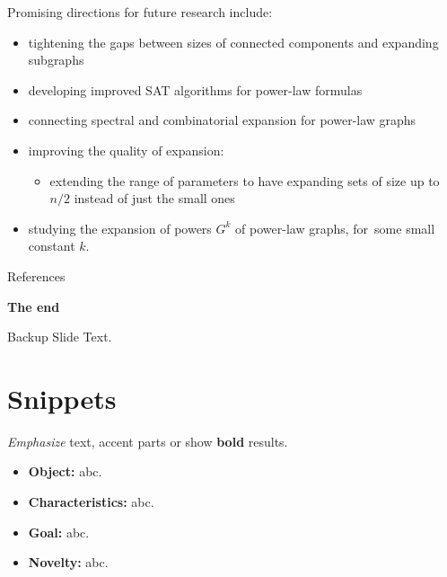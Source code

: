\documentclass{beamer}
\newcommand{\autotitle}{\secname\ifdefempty{\subsecname}{}{~--- \subsecname}}
\newcommand{\clearsubsecname}{\long\def\subsecname{}}
\begin{document}
\begin{frame}{\autotitle}
    \small
    Promising directions for future research include:
    \begin{itemize}
        \item tightening the gaps between sizes of connected components and expanding subgraphs
        \item developing improved SAT algorithms for power-law formulas
        \item connecting spectral and combinatorial expansion for power-law graphs
        \item improving the quality of expansion:
        \begin{itemize}
            \item extending the range of parameters to have expanding sets
            of size up to $n/2$ instead of just the small ones
        \end{itemize}
        \item studying the expansion of powers $G^k$ of power-law graphs,
        for~some small constant $k$.
    \end{itemize}
\end{frame}

\appendix

\begin{frame}[allowframebreaks]{References}
    
    
\end{frame}

\begin{frame}[standout]
    \centering
    \textbf{The end}
\end{frame}

\begin{frame}{Backup Slide}
    Text.
\end{frame}

\section{Snippets}
\clearsubsecname

\begin{frame}{\autotitle}
    \emph{Emphasize} text, \alert{accent} parts or show \textbf{bold} results.
    
    \begin{itemize}
        \item \textbf{Object:} abc.
        \item \textbf{Characteristics:} abc.
        \item \textbf{Goal:} abc.
        \item \textbf{Novelty:} abc.
    \end{itemize}
\end{frame}
\end{document}
